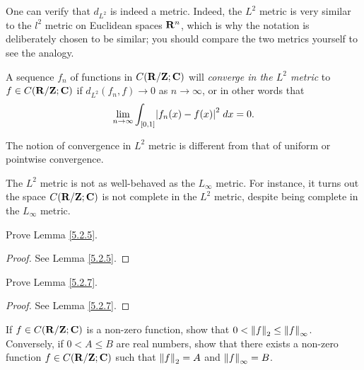 \begin{remark}\label{5.2.8}
    One can verify that \(d_{L^2}\) is indeed a metric.
    Indeed, the \(L^2\) metric is very similar to the \(l^2\) metric on Euclidean spaces \(\R^n\), which is why the notation is deliberately chosen to be similar;
    you should compare the two metrics yourself to see the analogy.
\end{remark}

\begin{note}
    A sequence \(f_n\) of functions in \(C(\R / \Z ; \C)\) will \emph{converge in the \(L^2\) metric} to \(f \in C(\R / \Z ; \C)\) if \(d_{L^2}(f_n, f) \to 0\) as \(n \to \infty\), or in other words that
    \[
        \lim_{n \to \infty} \int_{[0, 1]} \abs{f_n(x) - f(x)}^2 \; dx = 0.
    \]
\end{note}

\begin{remark}\label{5.2.9}
    The notion of convergence in \(L^2\) metric is different from that of uniform or pointwise convergence.
\end{remark}

\begin{remark}\label{5.2.10}
    The \(L^2\) metric is not as well-behaved as the \(L_\infty\) metric.
    For instance, it turns out the space \(C(\R / \Z ; \C)\) is not complete in the \(L^2\) metric, despite being complete in the \(L_\infty\) metric.
\end{remark}

\exercisesection

\begin{exercise}\label{ex 5.2.1}
    Prove Lemma \ref{5.2.5}.
\end{exercise}

\begin{proof}
    See Lemma \ref{5.2.5}.
\end{proof}

\begin{exercise}\label{ex 5.2.2}
    Prove Lemma \ref{5.2.7}.
\end{exercise}

\begin{proof}
    See Lemma \ref{5.2.7}.
\end{proof}

\begin{exercise}\label{ex 5.2.3}
    If \(f \in C(\R / \Z ; \C)\) is a non-zero function, show that \(0 < \norm*{f}_2 \leq \norm*{f}_\infty\).
    Conversely, if \(0 < A \leq B\) are real numbers, show that there exists a non-zero function \(f \in C(\R / \Z ; \C)\) such that \(\norm*{f}_2 = A\) and \(\norm*{f}_\infty = B\).
\end{exercise}

